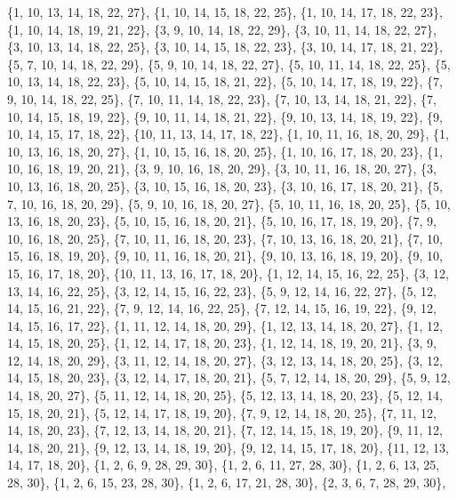 \documentclass[11pt,a4paper]{article}
\begin{document}
{\{1, 10, 13, 14, 18, 22, 27\}, \{1, 10, 14, 15, 18, 22, 25\}, \{1, 10, 14, 17, 18, 22, 23\}, \{1, 10, 14, 18, 19, 21, 22\}, \{3, 9, 10, 14, 18, 22, 29\},
\{3, 10, 11, 14, 18, 22, 27\}, \{3, 10, 13, 14, 18, 22, 25\}, \{3, 10, 14, 15, 18, 22, 23\}, \{3, 10, 14, 17, 18, 21, 22\}, \{5, 7, 10, 14, 18, 22, 29\},
\{5, 9, 10, 14, 18, 22, 27\}, \{5, 10, 11, 14, 18, 22, 25\}, \{5, 10, 13, 14, 18, 22, 23\}, \{5, 10, 14, 15, 18, 21, 22\}, \{5, 10, 14, 17, 18, 19, 22\},
\{7, 9, 10, 14, 18, 22, 25\}, \{7, 10, 11, 14, 18, 22, 23\}, \{7, 10, 13, 14, 18, 21, 22\}, \{7, 10, 14, 15, 18, 19, 22\}, \{9, 10, 11, 14, 18, 21, 22\},
\{9, 10, 13, 14, 18, 19, 22\}, \{9, 10, 14, 15, 17, 18, 22\}, \{10, 11, 13, 14, 17, 18, 22\}, \{1, 10, 11, 16, 18, 20, 29\}, \{1, 10, 13, 16, 18, 20, 27\},
\{1, 10, 15, 16, 18, 20, 25\}, \{1, 10, 16, 17, 18, 20, 23\}, \{1, 10, 16, 18, 19, 20, 21\}, \{3, 9, 10, 16, 18, 20, 29\}, \{3, 10, 11, 16, 18, 20, 27\},
\{3, 10, 13, 16, 18, 20, 25\}, \{3, 10, 15, 16, 18, 20, 23\}, \{3, 10, 16, 17, 18, 20, 21\}, \{5, 7, 10, 16, 18, 20, 29\}, \{5, 9, 10, 16, 18, 20, 27\},
\{5, 10, 11, 16, 18, 20, 25\}, \{5, 10, 13, 16, 18, 20, 23\}, \{5, 10, 15, 16, 18, 20, 21\}, \{5, 10, 16, 17, 18, 19, 20\}, \{7, 9, 10, 16, 18, 20, 25\},
\{7, 10, 11, 16, 18, 20, 23\}, \{7, 10, 13, 16, 18, 20, 21\}, \{7, 10, 15, 16, 18, 19, 20\}, \{9, 10, 11, 16, 18, 20, 21\}, \{9, 10, 13, 16, 18, 19, 20\},
\{9, 10, 15, 16, 17, 18, 20\}, \{10, 11, 13, 16, 17, 18, 20\}, \{1, 12, 14, 15, 16, 22, 25\}, \{3, 12, 13, 14, 16, 22, 25\}, \{3, 12, 14, 15, 16, 22, 23\},
\{5, 9, 12, 14, 16, 22, 27\}, \{5, 12, 14, 15, 16, 21, 22\}, \{7, 9, 12, 14, 16, 22, 25\}, \{7, 12, 14, 15, 16, 19, 22\}, \{9, 12, 14, 15, 16, 17, 22\},
\{1, 11, 12, 14, 18, 20, 29\}, \{1, 12, 13, 14, 18, 20, 27\}, \{1, 12, 14, 15, 18, 20, 25\}, \{1, 12, 14, 17, 18, 20, 23\}, \{1, 12, 14, 18, 19, 20, 21\},
\{3, 9, 12, 14, 18, 20, 29\}, \{3, 11, 12, 14, 18, 20, 27\}, \{3, 12, 13, 14, 18, 20, 25\}, \{3, 12, 14, 15, 18, 20, 23\}, \{3, 12, 14, 17, 18, 20, 21\},
\{5, 7, 12, 14, 18, 20, 29\}, \{5, 9, 12, 14, 18, 20, 27\}, \{5, 11, 12, 14, 18, 20, 25\}, \{5, 12, 13, 14, 18, 20, 23\}, \{5, 12, 14, 15, 18, 20, 21\},
\{5, 12, 14, 17, 18, 19, 20\}, \{7, 9, 12, 14, 18, 20, 25\}, \{7, 11, 12, 14, 18, 20, 23\}, \{7, 12, 13, 14, 18, 20, 21\}, \{7, 12, 14, 15, 18, 19, 20\},
\{9, 11, 12, 14, 18, 20, 21\}, \{9, 12, 13, 14, 18, 19, 20\}, \{9, 12, 14, 15, 17, 18, 20\}, \{11, 12, 13, 14, 17, 18, 20\}, \{1, 2, 6, 9, 28, 29, 30\},
\{1, 2, 6, 11, 27, 28, 30\}, \{1, 2, 6, 13, 25, 28, 30\}, \{1, 2, 6, 15, 23, 28, 30\}, \{1, 2, 6, 17, 21, 28, 30\}, \{2, 3, 6, 7, 28, 29, 30\},
}
\end{document}
